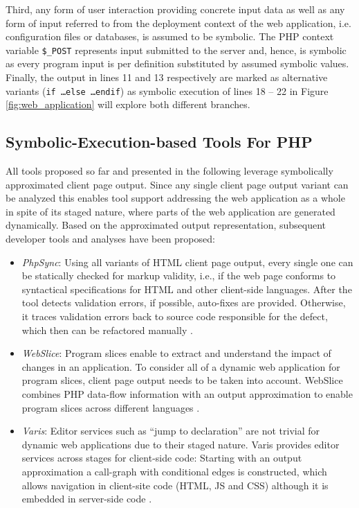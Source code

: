 \documentclass[sigconf, preprint]{acmart}
\renewcommand{\sf}[1]{\textsf{#1}}
\begin{document}
Third, any form of user interaction providing concrete input data as well as any
form of input referred to from the deployment context of the web application, i.e. configuration files
or databases, is assumed to be symbolic. The PHP context variable
\texttt{\$\_POST} represents input submitted to the server and, hence, is
symbolic as every program input is per definition substituted by assumed
symbolic values. Finally, the output in lines 11 and 13 respectively are marked as alternative variants
(\texttt{if \ldots else \ldots endif}) as symbolic execution of lines 18 – 22
in Figure \ref{fig:web_application} will explore both different branches.

\subsection{Symbolic-Execution-based Tools For PHP}\label{sec:existing_tools}
All tools proposed so far and presented in the following leverage symbolically
approximated client page output. Since any single client page output variant can
be analyzed this enables tool support addressing the web application as a whole
in spite of its staged nature, where parts of the web application are
generated dynamically.
Based on the approximated output representation, subsequent developer tools and
analyses have been proposed:
\begin{itemize}
	\item \emph{PhpSync}: Using all variants of HTML client page output, every
	single one can be statically checked for markup validity, i.e., if the web page
	conforms to syntactical specifications for HTML and other client-side
	languages. After the tool detects validation errors, if possible, auto-fixes
	are provided. Otherwise, it traces validation errors back to
	source code responsible for the defect, which then can be refactored manually
	\cite{Nguyen:2011:AFH:2190078.2190142}. 

	\item \emph{WebSlice}: Program slices enable to extract and understand the
	impact of changes in an application. To consider all of a dynamic web
	application for program slices, client page output needs to be taken into
	account. \sf{WebSlice} combines PHP data-flow information with an output
	approximation to enable program slices across different languages
	\cite{Nguyen:2015:CPS:2786805.2786872}.

	\item \emph{Varis}: Editor services such as “jump to declaration” are
	not trivial for dynamic web applications due to their staged nature. \sf{Varis}
	provides editor services across stages for client-side code: Starting with an
	output approximation a call-graph with conditional edges is constructed, which
	allows navigation in client-site code (HTML, JS and CSS) although it is
	embedded in server-side code
	\cite{Nguyen:2015:VIS:2819009.2819140,Nguyen:2014:BCG:2635868.2635928}.

\end{itemize}
\end{document}
